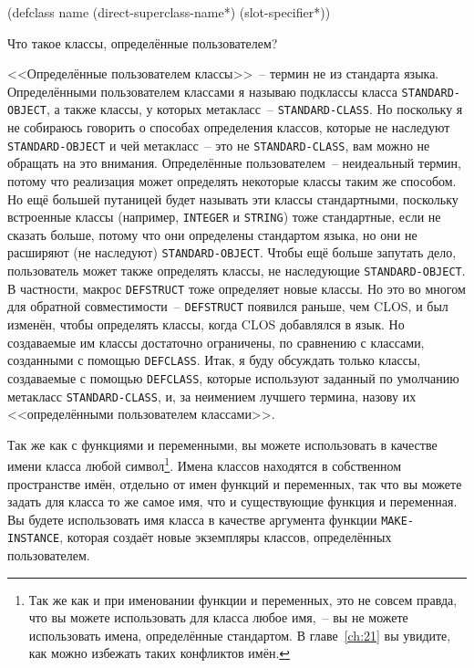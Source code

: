 \begin{myverb}
(defclass name (direct-superclass-name*)
  (slot-specifier*))
\end{myverb}

Что такое классы, определённые пользователем?

<<Определённые пользователем классы>>~-- термин не из стандарта языка. Определёнными
пользователем классами я называю подклассы класса \lstinline{STANDARD-OBJECT}, а также
классы, у которых метакласс~-- \lstinline{STANDARD-CLASS}. Но поскольку я не собираюсь
говорить о способах определения классов, которые не наследуют \lstinline{STANDARD-OBJECT}
и чей метакласс~-- это не \lstinline{STANDARD-CLASS}, вам можно не обращать на это
внимания. Определённые пользователем~-- неидеальный термин, потому что реализация может
определять некоторые классы таким же способом. Но ещё большей путаницей будет называть эти
классы стандартными, поскольку встроенные классы (например, \lstinline{INTEGER} и
\lstinline{STRING}) тоже стандартные, если не сказать больше, потому что они определены
стандартом языка, но они не расширяют (не наследуют) \lstinline{STANDARD-OBJECT}. Чтобы
ещё больше запутать дело, пользователь может также определять классы, не наследующие
\lstinline{STANDARD-OBJECT}. В частности, макрос \lstinline{DEFSTRUCT} тоже определяет
новые классы. Но это во многом для обратной совместимости~-- \lstinline{DEFSTRUCT}
появился раньше, чем CLOS, и был изменён, чтобы определять классы, когда CLOS добавлялся в
язык. Но создаваемые им классы достаточно ограничены, по сравнению с классами, созданными с
помощью \lstinline{DEFCLASS}. Итак, я буду обсуждать только классы, создаваемые с помощью
\lstinline{DEFCLASS}, которые используют заданный по умолчанию метакласс
\lstinline{STANDARD-CLASS}, и, за неимением лучшего термина, назову их <<определёнными
пользователем классами>>.

Так же как с функциями и переменными, вы можете использовать в качестве имени класса любой
символ\footnote{Так же как и при именовании функции и переменных, это не совсем правда,
  что вы можете использовать для класса любое имя,~-- вы не можете использовать имена,
  определённые стандартом.  В главе~\ref{ch:21} вы увидите, как можно избежать таких конфликтов
  имён.}.  Имена классов находятся в собственном пространстве имён, отдельно от имен
функций и переменных, так что вы можете задать для класса то же самое имя, что и
существующие функция и переменная.  Вы будете использовать имя класса в качестве аргумента
функции \lstinline{MAKE-INSTANCE}, которая создаёт новые экземпляры классов, определённых
пользователем.


